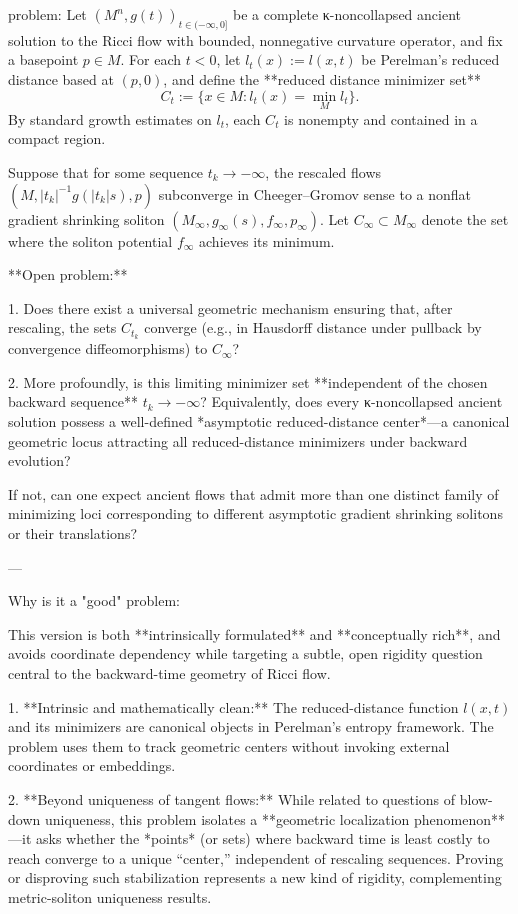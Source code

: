 problem:  
Let \((M^n,g(t))_{t\in(-\infty,0]}\) be a complete κ-noncollapsed ancient solution to the Ricci flow with bounded, nonnegative curvature operator, and fix a basepoint \(p\in M\).  
For each \(t<0\), let \(l_t(x):=l(x,t)\) be Perelman’s reduced distance based at \((p,0)\), and define the **reduced distance minimizer set**
\[
C_t := \{ x \in M : l_t(x) = \min_M l_t \}.
\]
By standard growth estimates on \(l_t\), each \(C_t\) is nonempty and contained in a compact region.

Suppose that for some sequence \(t_k\to -\infty\), the rescaled flows \((M,|t_k|^{-1}g(|t_k|s),p)\) subconverge in Cheeger–Gromov sense to a nonflat gradient shrinking soliton \((M_\infty,g_\infty(s),f_\infty,p_\infty)\).  
Let \(C_\infty\subset M_\infty\) denote the set where the soliton potential \(f_\infty\) achieves its minimum.

**Open problem:**  

1. Does there exist a universal geometric mechanism ensuring that, after rescaling, the sets \(C_{t_k}\) converge (e.g., in Hausdorff distance under pullback by convergence diffeomorphisms) to \(C_\infty\)?  

2. More profoundly, is this limiting minimizer set **independent of the chosen backward sequence** \(t_k\to-\infty\)?  
Equivalently, does every κ-noncollapsed ancient solution possess a well-defined *asymptotic reduced-distance center*—a canonical geometric locus attracting all reduced-distance minimizers under backward evolution?  

If not, can one expect ancient flows that admit more than one distinct family of minimizing loci corresponding to different asymptotic gradient shrinking solitons or their translations?

---

Why is it a "good" problem:  

This version is both **intrinsically formulated** and **conceptually rich**, and avoids coordinate dependency while targeting a subtle, open rigidity question central to the backward-time geometry of Ricci flow.

1. **Intrinsic and mathematically clean:**  
   The reduced-distance function \(l(x,t)\) and its minimizers are canonical objects in Perelman’s entropy framework. The problem uses them to track geometric centers without invoking external coordinates or embeddings.

2. **Beyond uniqueness of tangent flows:**  
   While related to questions of blow-down uniqueness, this problem isolates a **geometric localization phenomenon**—it asks whether the *points* (or sets) where backward time is least costly to reach converge to a unique “center,” independent of rescaling sequences. Proving or disproving such stabilization represents a new kind of rigidity, complementing metric-soliton uniqueness results.

